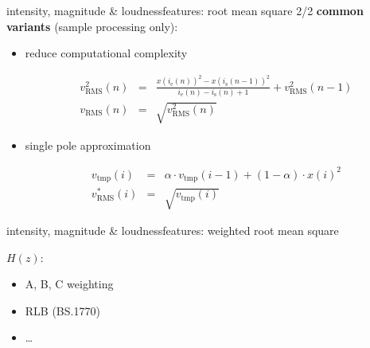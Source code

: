         \begin{frame}{intensity, magnitude \& loudness}{features: root mean square 2/2}
                \textbf{common variants}  (sample processing only):
                \begin{itemize}
                    \item<1->	reduce computational complexity
                        \begin{footnotesize}
                        \begin{eqnarray*}
                            v^2_{\mathrm{RMS}}(n) &=& \frac{x(i_{\mathrm{e}}(n))^2 - x(i_{\mathrm{s}}(n-1))^2}{i_{\mathrm{e}}(n)-i_{\mathrm{s}}(n) + 1} + v^2_{\mathrm{RMS}}(n-1) \\
                            v_{\mathrm{RMS}}(n)	&=& \sqrt{v^2_{\mathrm{RMS}}(n)}
                        \end{eqnarray*}
                        \end{footnotesize}
                    \smallskip
                    \item<2->	single pole approximation
                        \begin{footnotesize}
                        \begin{eqnarray*}
                            v_\mathrm{tmp}(i)	&=& \alpha\cdot v_\mathrm{tmp}(i-1) + (1-\alpha)\cdot x(i)^2\\
                            v^*_{\mathrm{RMS}}(i)		&=& \sqrt{v_\mathrm{tmp}(i)}
                        \end{eqnarray*}
                        \end{footnotesize}
                \end{itemize}
        \end{frame}
        \begin{frame}{intensity, magnitude \& loudness}{features: weighted root mean square}
            \vspace{-5mm}
            \begin{figure}
                \centering
                
            \end{figure}
            
            \pause
            \vspace{-10mm}
            $H(z)$:
            \begin{itemize}
                \item	A, B, C weighting
                \item	RLB (BS.1770)
                \item	\ldots
            \end{itemize}
            
        \end{frame}

